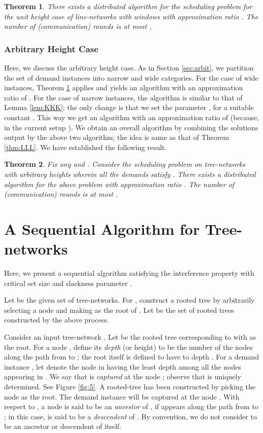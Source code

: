 \documentclass[11pt]{article}
\newtheorem{theorem}{\bf Theorem}[section]
\begin{document}
\begin{theorem}
\label{thm:MMM}
There exists a distributed algorithm for the scheduling problem for the unit height case of line-networks with windows
with approximation ratio . The number of (communication) rounds is at most 
,
\end{theorem}

\subsubsection*{Arbitrary Height Case}
Here, we discuss the arbitrary height case. As in Section \ref{sec:arbit}, we partition
the set of demand instances into narrow and wide categories.
For the case of wide instances, Theorem \ref{thm:MMM} applies and 
yields an algorithm with an approximation ratio of .
For the case of narrow instances, the algorithm is similar to that of Lemma \ref{lem:KKK};
the only change is that we set the parameter , for a suitable constant .
This way we get an algorithm with an approximation ratio of  
(because, in the current setup ).
We obtain an overall algorithm by combining the solutions output by the above two algorithm;
the idea is same as that of Theorem \ref{thm:LLL}. We have established the following result.

\begin{theorem}
Fix any  and . Consider the scheduling problem on tree-networks
with arbitrary heights wherein all the demands  satisfy .
There exists a distributed algorithm for the above problem with approximation ratio .
The number of (communication) rounds is at most 
.
\end{theorem}




\appendix
\section{A Sequential Algorithm for Tree-networks}
\label{sec:Lewin}
Here, we present a sequential algorithm satisfying the interference property with 
critical set size  and slackness parameter .

Let  be the given set of tree-networks.
For , construct a rooted tree  by arbitrarily selecting a node  
and making  as the root of . Let 
be the set of rooted trees constructed by the above process.

Consider an input tree-network . 
Let  be the rooted tree corresponding to  with  as the root.
For a node , define its {\em depth} (or height) to be the number
of the nodes along the path from  to ; the root  itself is defined to have to depth .
For a demand instance , let  denote the node in 
having the least depth among all the nodes appearing in .
We say that  is {\em captured} at the node ; observe that  is uniquely determined.
See Figure \ref{fig:5}. A rooted-tree  has been constructed by picking the node  as the root.
The demand instance  will be captured at the node .
With respect to , a node  is said to be an {\em ancestor} of ,
if  appears along the path from  to ; in this case,  is said to be a {\em descendent} of .
By convention, we do not consider  to be an ancestor or descendent of itself.
\end{document}
